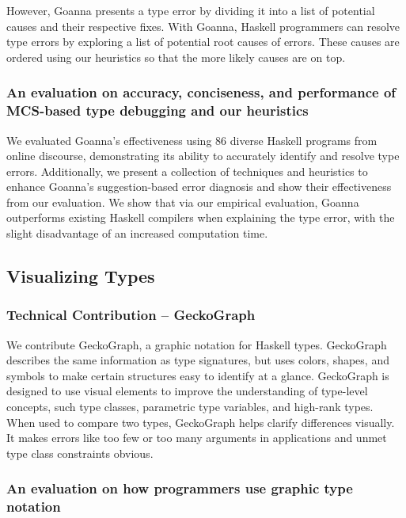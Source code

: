 However,  Goanna presents a type error by dividing it into a list of potential causes and their respective fixes. With Goanna, Haskell programmers can resolve type errors by exploring a list of potential root causes of errors. These causes are ordered using our heuristics so that the more likely causes are on top. 

\subsubsection{An evaluation on accuracy, conciseness, and performance of MCS-based type debugging and our heuristics}

We evaluated Goanna's effectiveness using 86 diverse Haskell programs from online discourse, demonstrating its ability to accurately identify and resolve type errors. Additionally, we present a collection of techniques and heuristics to enhance Goanna's suggestion-based error diagnosis and show their effectiveness from our evaluation.
We show that via our empirical evaluation, Goanna outperforms existing Haskell compilers when explaining the type error, with the slight disadvantage of an increased computation time.


\subsection{Visualizing Types}

\subsubsection{Technical Contribution -- GeckoGraph}

We contribute GeckoGraph, a graphic notation for Haskell types. GeckoGraph describes the same information as type signatures, but uses colors, shapes, and symbols to make certain structures easy to identify at a glance. GeckoGraph is designed to use visual elements to improve the understanding of type-level concepts, such type classes, parametric type variables, and high-rank types. When used to compare two types, GeckoGraph helps clarify differences visually. It makes errors like too few or too many arguments in applications and unmet type class constraints obvious.

\subsubsection{An evaluation on how programmers use graphic type notation}

